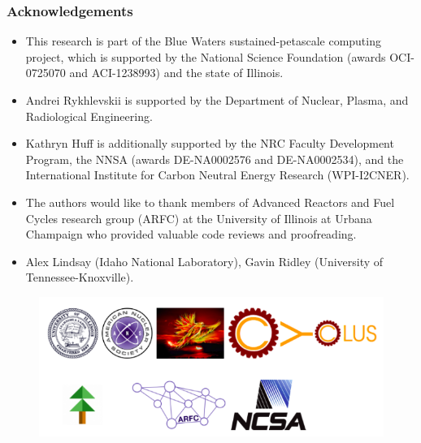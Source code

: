 \begin{frame}
  \frametitle{Acknowledgements}
  \begin{itemize}
    \item This research is part of the Blue Waters sustained-petascale computing project, 
which is supported by the National Science Foundation (awards OCI-0725070 and 
ACI-1238993) and the state of Illinois.
    \item Andrei Rykhlevskii is supported by the Department of Nuclear, Plasma, and Radiological Engineering.
    \item Kathryn Huff is additionally supported by the NRC Faculty Development Program, the NNSA (awards 
    DE-NA0002576 and DE-NA0002534), and the International Institute for Carbon Neutral Energy Research (WPI-I2CNER).
    \item The authors would like to thank  members of Advanced Reactors and Fuel Cycles
research group (ARFC) at the University of Illinois at Urbana Champaign who 
provided valuable code reviews and proofreading.
    \item Alex Lindsay (Idaho National Laboratory), Gavin Ridley (University of Tennessee-Knoxville).
  \end{itemize}
    \begin{figure}[t]
   \hspace*{-0.4in}
   \includegraphics[height=0.25\textheight]{./images/acks.png}
    \end{figure}
\end{frame}
